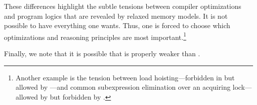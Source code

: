 These differences highlight the subtle tensions between compiler
optimizations and program logics that are revealed by relaxed memory models.
It is not possible to have everything one wants. Thus, one is forced to
choose which optimizations and reasoning principles are most
important.\footnote{Another example is the tension between load
  hoisting---forbidden in \cXI{} but allowed by \llvm{}---and common
  subexpression elimination over an acquiring lock---allowed by \cXI{} but
  forbidden by \llvm{} \cite{DBLP:conf/cgo/ChakrabortyV17}.}

Finally, we note that it is possible that \PS{} is properly weaker than \PwT{}.  










